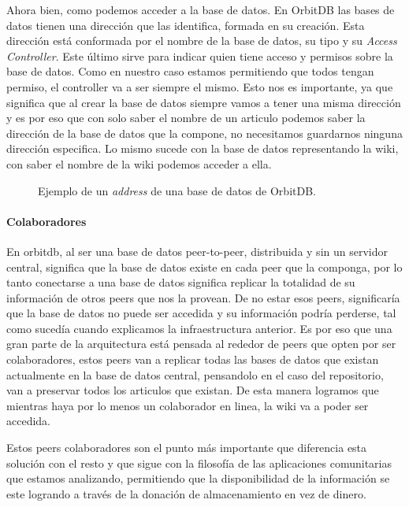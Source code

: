 Ahora bien, como podemos acceder a la base de datos. En OrbitDB las bases de datos tienen una dirección que las identifica, formada en su creación. Esta dirección está conformada por el nombre de la base de datos, su tipo y su \textit{Access Controller}. Este último sirve para indicar quien tiene acceso y permisos sobre la base de datos. Como en nuestro caso estamos permitiendo que todos tengan permiso, el controller va a ser siempre el mismo. Esto nos es importante, ya que significa que al crear la base de datos siempre vamos a tener una misma dirección y es por eso que con solo saber el nombre de un articulo podemos saber la dirección de la base de datos que la compone, no necesitamos guardarnos ninguna dirección especifica. Lo mismo sucede con la base de datos representando la wiki, con saber el nombre de la wiki podemos acceder a ella.

\begin{figure}[H]
\centering
{}
\caption{Ejemplo de un \textit{address} de una base de datos de OrbitDB.}
\end{figure}

\paragraph{Colaboradores}

En orbitdb, al ser una base de datos peer-to-peer, distribuida y sin un servidor central, significa que la base de datos existe en cada peer que la componga, por lo tanto conectarse a una base de datos significa replicar la totalidad de su información de otros peers que nos la provean. De no estar esos peers, significaría que la base de datos no puede ser accedida y su información podría perderse, tal como sucedía cuando explicamos la infraestructura anterior. Es por eso que una gran parte de la arquitectura está pensada al rededor de peers que opten por ser colaboradores, estos peers van a replicar todas las bases de datos que existan actualmente en la base de datos central, pensandolo en el caso del repositorio, van a preservar todos los articulos que existan. De esta manera logramos que mientras haya por lo menos un colaborador en linea, la wiki va a poder ser accedida.

Estos peers colaboradores son el punto más importante que diferencia esta solución con el resto y que sigue con la filosofía de las aplicaciones comunitarias que estamos analizando, permitiendo que la disponibilidad de la información se este logrando a través de la donación de almacenamiento en vez de dinero.

